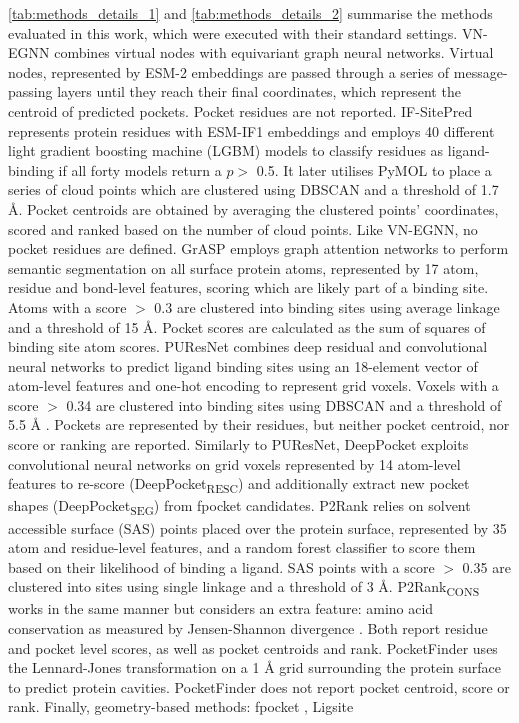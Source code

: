 \autoref{tab:methods_details_1} and \autoref{tab:methods_details_2} summarise the methods evaluated in this work, which were executed with their standard settings. VN-EGNN \cite{SESTAK_2024_VNEGNN} combines virtual nodes with equivariant graph neural networks. Virtual nodes, represented by ESM-2 embeddings \cite{RIVES_2021_EMBEDDINGS} are passed through a series of message-passing layers until they reach their final coordinates, which represent the centroid of predicted pockets. Pocket residues are not reported. IF-SitePred \cite{CARBERY_2024_IFSP} represents protein residues with ESM-IF1 embeddings \cite{HSU_2022_EMBEDDINGS} and employs 40 different light gradient boosting machine (LGBM) models \cite{KE_2017_LIGHTGBM} to classify residues as ligand-binding if all forty models return a $p >$ 0.5. It later utilises PyMOL \cite{SCHRODINGER_2015_PYMOL} to place a series of cloud points which are clustered using DBSCAN \cite{ESTER_1996_DBSCAN}  and a threshold of 1.7 \AA{}. Pocket centroids are obtained by averaging the clustered points’ coordinates, scored and ranked based on the number of cloud points. Like VN-EGNN, no pocket residues are defined. GrASP \cite{SMITH_2024_GrASP} employs graph attention networks to perform semantic segmentation on all surface protein atoms, represented by 17 atom, residue and bond-level features, scoring which are likely part of a binding site. Atoms with a score $>$ 0.3 are clustered into binding sites using average linkage and a threshold of 15 \AA{}. Pocket scores are calculated as the sum of squares of binding site atom scores. PUResNet \cite{KANDEL_2021_PURESNET} combines deep residual and convolutional neural networks to predict ligand binding sites using an 18-element vector of atom-level features and one-hot encoding to represent grid voxels. Voxels with a score $>$ 0.34 are clustered into binding sites using DBSCAN and a threshold of 5.5 \AA{} \cite{KANDEL_2024_PURESNET}. Pockets are represented by their residues, but neither pocket centroid, nor score or ranking are reported. Similarly to PUResNet, DeepPocket \cite{AGGARWAL_2022_DEEPPOCKET} exploits convolutional neural networks on grid voxels represented by 14 atom-level features to re-score (DeepPocket\textsubscript{RESC}) and additionally extract new pocket shapes (DeepPocket\textsubscript{SEG}) from fpocket candidates. P2Rank \cite{KRIVAK_2018_P2RANK} relies on solvent accessible surface (SAS) points placed over the protein surface, represented by 35 atom and residue-level features, and a random forest classifier to score them based on their likelihood of binding a ligand. SAS points with a score $>$ 0.35 are clustered into sites using single linkage and a threshold of 3 \AA{}. P2Rank\textsubscript{CONS} \cite{JENDELE_2019_PRANKWEB} works in the same manner but considers an extra feature: amino acid conservation as measured by Jensen-Shannon divergence \cite{CAPRA_2007_JSD}. Both report residue and pocket level scores, as well as pocket centroids and rank. PocketFinder \cite{AN_2005_POCKETFINDER} uses the Lennard-Jones \cite{JONES_1924_POTENTIAL} transformation on a 1 \AA{} grid surrounding the protein surface to predict protein cavities. PocketFinder does not report pocket centroid, score or rank. Finally, geometry-based methods: fpocket \cite{GUILLOUX_2009_FPOCKET}, Ligsite 